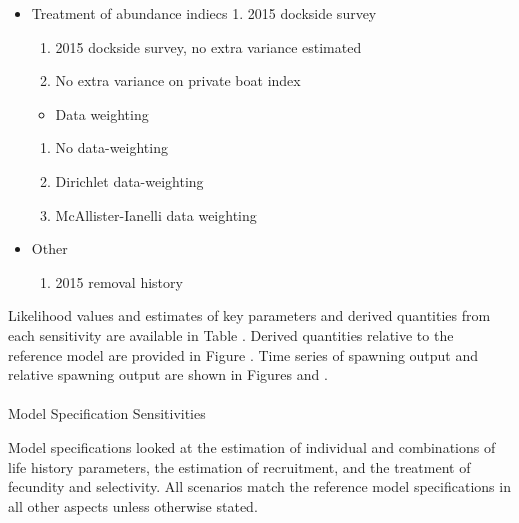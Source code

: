 \documentclass[
]{scrartcl}
\makeatletter
\let\oldparagraph\paragraph
\renewcommand{\paragraph}{
    \@ifstar
      \xxxParagraphStar
      \xxxParagraphNoStar
  }
\newcommand{\xxxParagraphStar}[1]{\oldparagraph*{#1}\mbox{}}
\newcommand{\xxxParagraphNoStar}[1]{\oldparagraph{#1}\mbox{}}
\providecommand{\tightlist}{%
  \setlength{\itemsep}{0pt}\setlength{\parskip}{0pt}}\usepackage{longtable,booktabs,array}
\makeatother
\begin{document}
\begin{itemize}
\tightlist
\item
  Treatment of abundance indiecs 1. 2015 dockside survey

  \begin{enumerate}
  \def\labelenumi{\arabic{enumi}.}
  \setcounter{enumi}{1}
  \tightlist
  \item
    2015 dockside survey, no extra variance estimated
  \item
    No extra variance on private boat index
  \end{enumerate}

  \begin{itemize}
  \tightlist
  \item
    Data weighting
  \end{itemize}

  \begin{enumerate}
  \def\labelenumi{\arabic{enumi}.}
  \setcounter{enumi}{10}
  \tightlist
  \item
    No data-weighting
  \item
    Dirichlet data-weighting
  \item
    McAllister-Ianelli data weighting
  \end{enumerate}
\item
  Other

  \begin{enumerate}
  \def\labelenumi{\arabic{enumi}.}
  \setcounter{enumi}{13}
  \tightlist
  \item
    2015 removal history
  \end{enumerate}
\end{itemize}

Likelihood values and estimates of key parameters and derived quantities
from each sensitivity are available in Table . Derived quantities
relative to the reference model are provided in Figure . Time series of
spawning output and relative spawning output are shown in Figures and .

\paragraph{Model Specification Sensitivities}\label{senstivities}

Model specifications looked at the estimation of individual and
combinations of life history parameters, the estimation of recruitment,
and the treatment of fecundity and selectivity. All scenarios match the
reference model specifications in all other aspects unless otherwise
stated.
\end{document}
